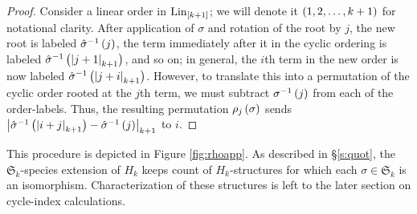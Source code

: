 \documentclass[sectionflow,singlespace,twoside,boldmathhdr]{brandiss} %
\numberwithin{section}{chapter}
\numberwithin{figure}{chapter}
\begin{document}
\begin{proof}
  Consider a linear order in $\operatorname{Lin}_{\left[ {k+1} \right]}$; we will denote it $\left( {1, 2, \dots, k+1} \right)$ for notational clarity.
  After application of $\sigma$ and rotation of the root by $j$, the new root is labeled $\hat{\sigma}^{-1} \left( {j} \right)$, the term immediately after it in the cyclic ordering is labeled $\hat{\sigma}^{-1} \left( {\left\vert {j+1} \right\vert_{k+1}} \right)$, and so on; in general, the $i$th term in the new order is now labeled $\hat{\sigma}^{-1} \left( {\left\vert {j+i} \right\vert_{k+1}} \right)$.
  However, to translate this into a permutation of the cyclic order rooted at the $j$th term, we must subtract $\sigma^{-1} \left( {j} \right)$ from each of the order-labels.
  Thus, the resulting permutation $\rho_{j} \left( {\sigma} \right)$ sends $\left\vert {\hat{\sigma}^{-1} \ensuremath{\left( {\left\vert {i + j} \right\vert_{k+1}} \right)} - \hat{\sigma}^{-1} \ensuremath{\left( {j} \right)}} \right\vert_{k+1}$ to $i$.
\end{proof}

This procedure is depicted in Figure \ref{fig:rhoapp}.
As described in \S \ref{s:quot}, the $\mathfrak{S}_{k}$-species extension of $H_{k}$ keeps count of $H_{k}$-structures for which each $\sigma \in \mathfrak{S}_{k}$ is an isomorphism.
Characterization of these structures is left to the later section on cycle-index calculations.
\end{document}
